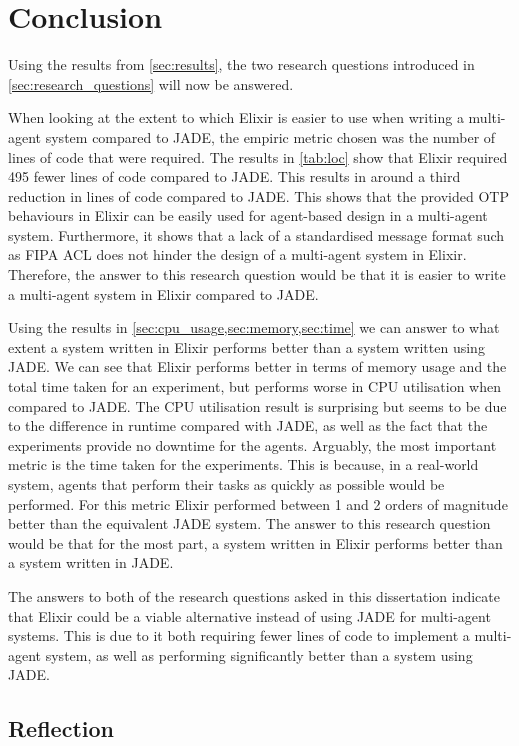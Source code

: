 \section{Conclusion}

Using the results from \cref{sec:results}, the two research questions introduced in \cref{sec:research_questions} will now be answered.

When looking at the extent to which Elixir is easier to use when writing a multi-agent system compared to JADE, the empiric metric chosen was the number of lines of code that were required.
The results in \cref{tab:loc} show that Elixir required 495 fewer lines of code compared to JADE\@.
This results in around a third reduction in lines of code compared to JADE\@.
This shows that the provided OTP behaviours in Elixir can be easily used for agent-based design in a multi-agent system.
Furthermore, it shows that a lack of a standardised message format such as FIPA ACL does not hinder the design of a multi-agent system in Elixir.
Therefore, the answer to this research question would be that it is easier to write a multi-agent system in Elixir compared to JADE\@.

Using the results in \cref{sec:cpu_usage,sec:memory,sec:time} we can answer to what extent a system written in Elixir performs better than a system written using JADE\@.
We can see that Elixir performs better in terms of memory usage and the total time taken for an experiment, but performs worse in CPU utilisation when compared to JADE\@.
The CPU utilisation result is surprising but seems to be due to the difference in runtime compared with JADE, as well as the fact that the experiments provide no downtime for the agents.
Arguably, the most important metric is the time taken for the experiments.
This is because, in a real-world system, agents that perform their tasks as quickly as possible would be performed.
For this metric Elixir performed between 1 and 2 orders of magnitude better than the equivalent JADE system.
The answer to this research question would be that for the most part, a system written in Elixir performs better than a system written in JADE\@.

The answers to both of the research questions asked in this dissertation indicate that Elixir could be a viable alternative instead of using JADE for multi-agent systems.
This is due to it both requiring fewer lines of code to implement a multi-agent system, as well as performing significantly better than a system using JADE\@.

\subsection{Reflection}

